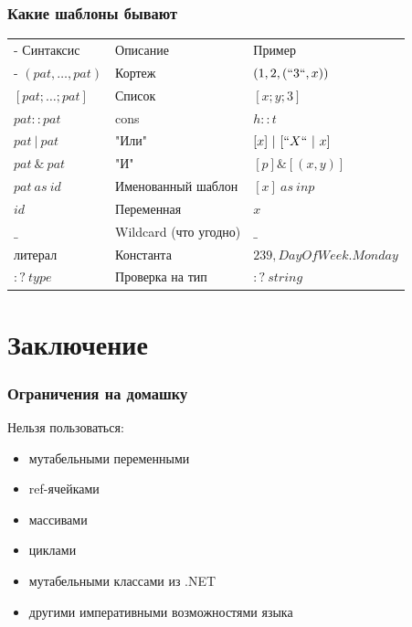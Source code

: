 \documentclass[xetex,mathserif,serif]{beamer}
\begin{document}
	\begin{frame}
		\frametitle{Какие шаблоны бывают}
		\begin{small}
			\begin{tabu} {| X[0.9 l p] | X[1 l p] | X[1 l p] |}
				\tabucline-
				Синтаксис                               & Описание                  & Пример                  \\
				\tabucline-
				\everyrow{\tabucline-}
				$(pat, \ldots, pat)$                    & Кортеж                    & $(1, 2, (``3``, x))$    \\
				$[pat; \ldots; pat]$                    & Список                    & $[x; y; 3]$             \\
				$pat :: pat$                            & cons                      & $h :: t$                \\
				$pat\ |\ pat$                           & "Или"                     & $[x]\ |\ [``X``\ |\ x]$ \\
				$pat\ \&\ pat$                          & "И"                       & $[p] \& [(x, y)]$       \\
				$pat\ as\ id$                           & Именованный шаблон        & $[x]\ as\ inp$          \\
				$id$                                    & Переменная                & $x$                     \\
				$\_$                                    & Wildcard (что угодно)     & $\_$                    \\
				литерал                                 & Константа                 & $239, DayOfWeek.Monday$ \\
				$:?\ type$                              & Проверка на тип           & $:?\ string$            \\
			\end{tabu}
		\end{small}
	\end{frame}

	\section{Заключение}

	\begin{frame}
		\frametitle{Ограничения на домашку}
		Нельзя пользоваться:
		\begin{itemize}
			\item мутабельными переменными
			\item ref-ячейками
			\item массивами
			\item циклами
			\item мутабельными классами из .NET
			\item другими императивными возможностями языка
		\end{itemize}
	\end{frame}
\end{document}
